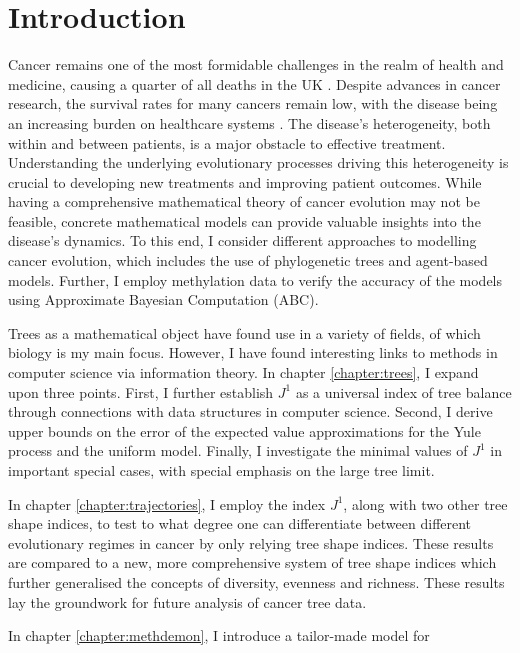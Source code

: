 \chapter{Introduction}\label{chapter:introduction}
Cancer remains one of the most formidable challenges in the realm of health and
medicine, causing a quarter of all deaths in the UK
\cite{cancer_research_uk_cancer_2015}. Despite advances in cancer research, the survival
rates for many cancers remain low, with the disease being an increasing burden
on healthcare systems \cite{noauthor_financial_nodate}. The disease's
heterogeneity, both within and between patients, is a major obstacle to
effective treatment. Understanding the underlying evolutionary processes
driving this heterogeneity is crucial to developing new treatments and
improving patient outcomes. While having a comprehensive mathematical theory of
cancer evolution may not be feasible, concrete mathematical models can provide
valuable insights into the disease's dynamics. To this end, I consider
different approaches to modelling cancer evolution, which includes the use of
phylogenetic trees and agent-based models. Further, I employ methylation data
to verify the accuracy of the models using Approximate Bayesian Computation
(ABC).\par
Trees as a mathematical object have found use in a variety of fields, of which
biology is my main focus. However, I have found interesting links to methods in
computer science via information theory. In chapter \ref{chapter:trees}, I
expand upon three points. First, I further establish $J^1$ as a universal index
of tree balance through connections with data structures in computer science.
Second, I derive upper bounds on the error of the expected value approximations
for the Yule process and the uniform model. Finally, I investigate the minimal
values of $J^1$ in important special cases, with special emphasis on the large
tree limit. \par
In chapter \ref{chapter:trajectories}, I employ the index $J^1$, along with two
other tree shape indices, to test to what degree one can differentiate between
different evolutionary regimes in cancer by only relying tree shape indices.
These results are compared to a new, more comprehensive system of tree shape
indices \cite{noble_new_2023} which further generalised the concepts of
diversity, evenness and richness. These results lay the groundwork for future
analysis of cancer tree data.\par
In chapter \ref{chapter:methdemon}, I introduce a tailor-made model for
